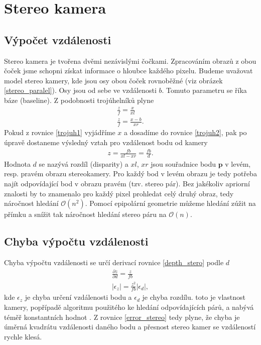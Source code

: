 \documentclass[twoside]{ctuthesis}
\newcommand{\tl}[1]{$\mathbf{#1}$}
\begin{document}
\section{Stereo kamera}
\subsection{Výpočet vzdálenosti}
Stereo kamera je tvořena dvěmi nezávislými čočkami. Zpracováním obrazů z obou čoček jsme schopni získat informace o hloubce každého pixelu. Budeme uvažovat model stereo kamery, kde jsou osy obou čoček rovnoběžné (viz obrázek \ref{stereo_paralel}). Osy jsou od sebe ve vzdálenosti $b$. Tomuto parametru se říka báze (baseline). Z podobnosti trojúhelníků plyne
\begin{align}
    \frac{z}{f} = \frac{x}{xl} \label{trojuh1} \\
    \frac{z}{f} = \frac{x - b}{xr} \label{trojuh2}.
\end{align}
Pokud z rovnice \ref{trojuh1} vyjádříme $x$ a dosadíme do rovnice \ref{trojuh2}, pak po úpravě dostaneme výsledný vztah pro vzdálenost bodu od kamery 
\begin{align}
    z = \frac{fb}{xl - xr} = \frac{fb}{d}.
    \label{depth_stero}
\end{align}
Hodnota $d$ se nazývá rozdíl (disparity) a $xl$, $xr$ jsou souřadnice bodu \tl{p} v levém, resp. pravém obrazu stereokamery. Pro každý bod v levém obrazu je tedy potřeba najít odpovídající bod v obrazu pravém (tzv. stereo pár). Bez jakékoliv apriorní znalosti by to znamenalo pro každý pixel prohledat celý druhý obraz, tedy náročnost hledání $\mathcal{O}(n^2)$. Pomocí epipolární geometrie můžeme hledání zúžit na přímku  a snížit tak náročnost hledání stereo páru na $\mathcal{O}(n)$. \cite{brown2003advances_in_stereo}

\subsection{Chyba výpočtu vzdálenosti}
Chyba výpočtu vzdálenosti se určí derivací rovnice \ref{depth_stero} podle $d$ \cite{keselman2017intel} 
\begin{align}
    \frac{\partial z}{\partial d} = \frac{z}{fb} \\
    |\epsilon_z | = \frac{z^2}{fb}|\epsilon_d |,
    \label{error_stereo}
\end{align}
kde $\epsilon_z $ je chyba určení vzdálenosti bodu a $ \epsilon_d $ je chyba rozdílu. toto je vlastnost kamery, popřípadě algoritmu použitého ke hledání odpovídajících párů, a nabývá téměř konstantních hodnot \cite{keselman2017intel}. Z rovnice \ref{error_stereo} tedy plyne, že chyba je úměrná kvadrátu vzdálenosti daného bodu a přesnost stereo kamer se vzdáleností rychle klesá.
\end{document}
